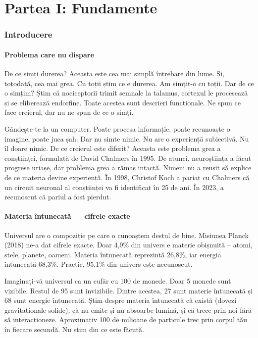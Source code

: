 \documentclass[11pt,a4paper]{article}
\begin{document}
\newpage
\part*{Partea I: Fundamente}

\section{Introducere}

\subsection{Problema care nu dispare}
De ce simți durerea? Aceasta este cea mai simplă întrebare din lume. Și, totodată, cea mai grea. Cu toții știm ce e durerea. Am simțit-o cu toții. Dar de ce o simțim? Știm că nociceptorii trimit semnale la talamus, cortexul le procesează și se eliberează endorfine. Toate acestea sunt descrieri funcționale. Ne spun ce face creierul, dar nu ne spun de ce o simți.

Gândește-te la un computer. Poate procesa informație, poate recunoaște o imagine, poate juca șah. Dar nu simte nimic. Nu are o experiență subiectivă. Nu îl doare nimic. De ce creierul este diferit? Aceasta este problema grea a conștiinței, formulată de David Chalmers în 1995. De atunci, neuroștiința a făcut progrese uriașe, dar problema grea a rămas intactă. Nimeni nu a reușit să explice de ce materia devine experiență. În 1998, Christof Koch a pariat cu Chalmers că un circuit neuronal al conștiinței va fi identificat în 25 de ani. În 2023, a recunoscut că pariul a fost pierdut.

\subsection{Materia întunecată — cifrele exacte}
Universul are o compoziție pe care o cunoaștem destul de bine. Misiunea Planck (2018) ne-a dat cifrele exacte. Doar 4,9\% din univers e materie obișnuită – atomi, stele, planete, oameni. Materia întunecată reprezintă 26,8\%, iar energia întunecată 68,3\%. Practic, 95,1\% din univers este necunoscut.

Imaginați-vă universul ca un cufăr cu 100 de monede. Doar 5 monede sunt vizibile. Restul de 95 sunt invizibile. Dintre acestea, 27 sunt materie întunecată și 68 sunt energie întunecată. Știm despre materia întunecată că există (dovezi gravitaționale solide), că nu emite și nu absoarbe lumină, și că trece prin noi fără să interacționeze. Aproximativ 100 de milioane de particule trec prin corpul tău în fiecare secundă. Nu știm din ce este făcută.
\end{document}
